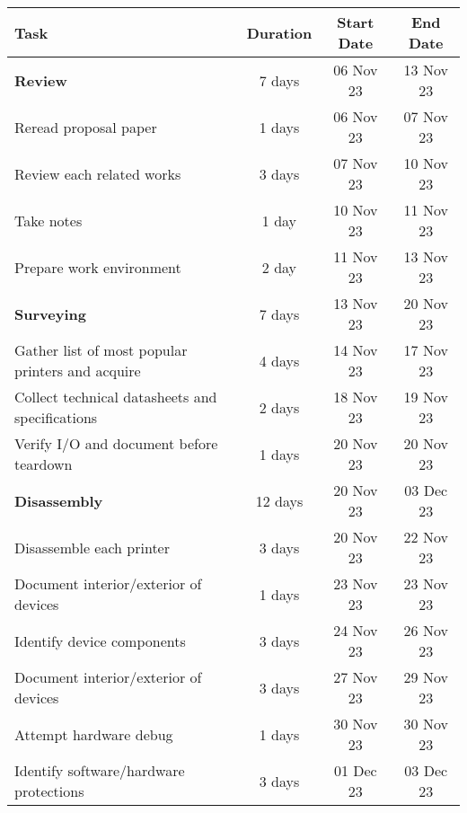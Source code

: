 \begin{table}[h]
  \centering
  \begin{tabular}{ |l||c|c|c| }
    \hline\rowcolor{gray!30}

    \textbf{Task} & \textbf{Duration} & \textbf{Start Date} & \textbf{End Date} \\
  
    \hline


    \hline\rowcolor{gray!10} 

    \textbf{Review} & 7 days & 06 Nov 23 & 13 Nov 23 \\

    Reread proposal paper & 1 days & 06 Nov 23 & 07 Nov 23 \\
    Review each related works & 3 days & 07 Nov 23 & 10 Nov 23 \\
    Take notes & 1 day & 10 Nov 23 & 11 Nov 23 \\
    Prepare work environment & 2 day & 11 Nov 23 & 13 Nov 23 \\

    \hline
    \hline\rowcolor{gray!10} 

    \textbf{Surveying} & 7 days & 13 Nov 23 & 20 Nov 23 \\

    Gather list of most popular printers and acquire & 4 days & 14 Nov 23 & 17 Nov 23 \\
    Collect technical datasheets and specifications & 2 days & 18 Nov 23 & 19 Nov 23 \\
    Verify I/O and document before teardown & 1 days & 20 Nov 23 & 20 Nov 23 \\

    \hline
    \hline\rowcolor{gray!10} 

    \textbf{Disassembly} & 12 days & 20 Nov 23 & 03 Dec 23 \\

    Disassemble each printer & 3 days & 20 Nov 23 & 22 Nov 23 \\
    Document interior/exterior of devices & 1 days & 23 Nov 23 & 23 Nov 23 \\
    Identify device components & 3 days & 24 Nov 23 & 26 Nov 23 \\
    Document interior/exterior of devices & 3 days & 27 Nov 23 & 29 Nov 23 \\
    Attempt hardware debug & 1 days & 30 Nov 23 & 30 Nov 23 \\
    Identify software/hardware protections & 3 days & 01 Dec 23 & 03 Dec 23 \\


\end{tabular}
\end{table}
